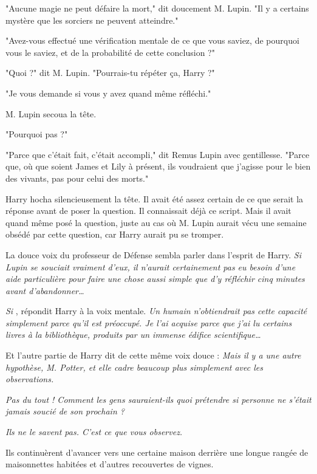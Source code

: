 "Aucune magie ne peut défaire la mort," dit doucement M. Lupin. "Il y a certains mystère que les sorciers ne peuvent atteindre."

"Avez-vous effectué une vérification mentale de ce que vous saviez, de pourquoi vous le saviez, et de la probabilité de cette conclusion ?"

"Quoi ?" dit M. Lupin. "Pourrais-tu répéter ça, Harry ?"

"Je vous demande si vous y avez quand même réfléchi."

M. Lupin secoua la tête.

"Pourquoi pas ?"

"Parce que c'était fait, c'était accompli," dit Remus Lupin avec gentillesse. "Parce que, où que soient James et Lily à présent, ils voudraient que j'agisse pour le bien des vivants, pas pour celui des morts."

Harry hocha silencieusement la tête. Il avait été assez certain de ce que serait la réponse avant de poser la question. Il connaissait déjà ce script. Mais il avait quand même posé la question, juste au cas où M. Lupin aurait vécu une semaine obsédé par cette question, car Harry aurait pu se tromper.

La douce voix du professeur de Défense sembla parler dans l'esprit de Harry. \emph{Si Lupin se souciait vraiment d'eux, il n'aurait certainement pas eu besoin d'une aide particulière pour faire une chose aussi simple que d'y réfléchir cinq minutes avant d'abandonner…} 

\emph{Si} , répondit Harry à la voix mentale. \emph{Un humain n'obtiendrait pas cette capacité simplement parce qu'il est préoccupé. Je l'ai acquise parce que j'ai lu certains livres à la bibliothèque, produits par un immense édifice scientifique…} 

Et l'autre partie de Harry dit de cette même voix douce : \emph{Mais il y a une autre hypothèse, M. Potter, et elle cadre beaucoup plus simplement avec les observations.} 

\emph{Pas du tout ! Comment les gens sauraient-ils quoi prétendre si personne ne s'était jamais soucié de son prochain ?} 

\emph{Ils ne le savent pas. C'est ce que vous observez.} 

Ils continuèrent d'avancer vers une certaine maison derrière une longue rangée de maisonnettes habitées et d'autres recouvertes de vignes.

